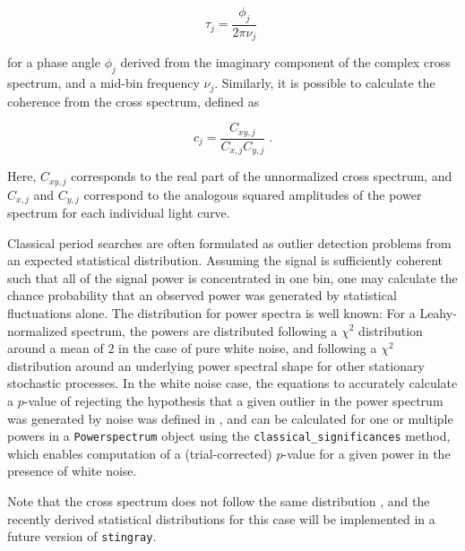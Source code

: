 \documentclass[12pt]{emulateapj}
\newcommand{\stingray}{\texttt{stingray}\xspace}
\newcommand{\powerspectrum}{\texttt{Powerspectrum}\xspace}
\begin{document}
\[
\tau_j = \frac{\phi_j}{2\pi\nu_j} \; 
\]

\noindent for a phase angle $\phi_j$ derived from the imaginary component of the complex cross spectrum, and a mid-bin frequency $\nu_j$. Similarly, it is possible to calculate the coherence \citep{vaughan1997,nowak1999} from the cross spectrum, defined as 

\begin{equation}
c_j = \frac{C_{xy,j}}{C_{x,j} C_{y,j}} \; . 
\end{equation}

\noindent Here, $C_{xy,j}$ corresponds to the real part of the unnormalized cross spectrum, and $C_{x,j}$ and $C_{y,j}$ correspond to the analogous squared amplitudes of the power spectrum for each individual light curve. 

Classical period searches are often formulated as outlier detection problems from an expected statistical distribution. Assuming the signal is sufficiently coherent such that all of the signal power is concentrated in one bin, one may calculate the chance probability that an observed power was generated by statistical fluctuations alone. The distribution for power spectra is well known: For a Leahy-normalized spectrum, the powers are distributed following a $\chi^2$ distribution around a mean of $2$ in the case of pure white noise, and following a $\chi^2$ distribution around an underlying power spectral shape for other stationary stochastic processes. In the white noise case, the equations to accurately calculate a $p$-value of rejecting the hypothesis that a given outlier in the power spectrum was generated by noise was defined in \citep{Groth1975}, and can be calculated for one or multiple powers in a \powerspectrum object using the \verb|classical_significances| method, which enables computation of a (trial-corrected) $p$-value for a given power in the presence of white noise.%


Note that the cross spectrum does not follow the same distribution \citep{huppenkothen2017}, and the recently derived statistical distributions for this case will be implemented in a future version of \stingray. 
\end{document}

